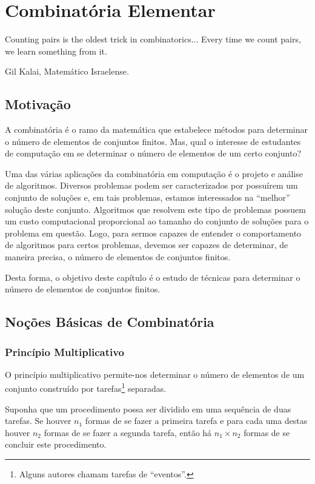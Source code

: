 \chapter{Combinatória Elementar}\label{cap6}

\epigraph{Counting pairs is the oldest trick in combinatorics... Every
  time we count pairs, we learn something from it.}{Gil Kalai,
  Matemático Israelense.}

\section{Motivação}

A combinatória é o ramo da matemática que estabelece métodos para
determinar o número de elementos de conjuntos finitos. Mas, qual o
interesse de estudantes de computação em se determinar o número de
elementos de um certo conjunto?

Uma das várias aplicações da combinatória em computação é o projeto e análise
de algoritmos. Diversos problemas podem ser caracterizados por
possuírem um conjunto de soluções e, em tais problemas,
estamos interessados na ``melhor'' solução deste conjunto. Algoritmos que resolvem este tipo de problemas
possuem um custo computacional proporcional ao tamanho do conjunto de
soluções para o problema em questão. Logo, para sermos capazes de
entender o comportamento de algoritmos para certos problemas, devemos
ser capazes de determinar, de maneira precisa, o número de elementos
de conjuntos finitos.

Desta forma, o objetivo deste capítulo é o estudo de técnicas para
determinar o número de elementos de conjuntos finitos.

\section{Noções Básicas de Combinatória}

\subsection{Princípio Multiplicativo}

O princípio multiplicativo permite-nos determinar o número de
elementos de um conjunto construído por tarefas\footnote{Alguns
  autores chamam tarefas de ``eventos''.} separadas.

\begin{Definition}
Suponha que um procedimento possa ser dividido em uma sequência de
duas tarefas. Se houver $n_1$ formas de se fazer a primeira tarefa e
para cada uma destas houver $n_2$ formas de se fazer a segunda tarefa,
então há $n_1\times n_2$ formas de se concluir este procedimento.
\end{Definition}

